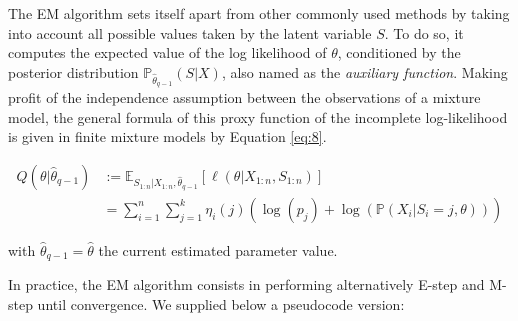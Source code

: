 The EM algorithm sets itself apart from other commonly used methods by taking
into account all possible values taken by the latent variable \(S\). To do
so, it computes the expected value of the log likelihood of \(\theta\),
conditioned by the posterior distribution
\(\mathbb{P}_{\hat{\theta}_{q-1}} (S|X)\), also named as the \emph{auxiliary
function}. Making profit of the independence assumption between the
observations of a mixture model, the general formula of this proxy
function of the incomplete log-likelihood is given in finite mixture
models by Equation \eqref{eq:8}.

\begin{equation}
\begin{split}
Q(\theta|\hat{\theta}_{q-1}) & := \mathbb{E}_{S_{1:n}| X_{1:n}, \hat{\theta}_{q-1}} \left[\ell(\theta | X_{1:n}, S_{1:n})\right] \\
&=\sum_{i=1}^n \sum_{j=1}^k \eta_{i}(j) \left( \log (p_j) +  \log (\mathbb{P}(X_i|S_i=j, \theta)) \right)
\end{split}
\label{eq:8}
\end{equation}

with \(\hat{\theta}_{q-1}=\hat{\theta}\) the current estimated parameter
value.

In practice, the EM algorithm consists in performing alternatively E-step and M-step until convergence. We supplied below a pseudocode version:

